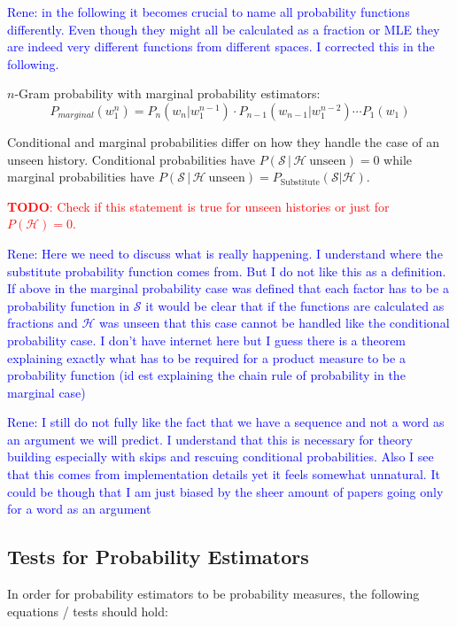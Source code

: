 \documentclass[11pt,a4paper]{article}
\newcommand{\Seq}{\mathcal{S}}
\newcommand{\Hist}{\mathcal{H}}
\newcommand{\todo}[1]{\textcolor{red}{\textbf{TODO}: #1}}
\newcommand{\rp}[1]{\textcolor{blue}{Rene: #1}}
\begin{document}
  \rp{in the following it becomes crucial to name all probability functions
  differently. Even though they might all be calculated as a fraction or MLE
  they are indeed very different functions from different spaces. I corrected
  this in the following.}

  $n$-Gram probability with marginal probability estimators:
  \begin{equation}
    P_{marginal}(w_1^n) = P_n(w_n | w_1^{n-1}) \cdot P_{n-1}(w_{n-1} | w_1^{n-2}) \dotsm P_1(w_1)
  \end{equation}

  Conditional and marginal probabilities differ  on how they handle the case of
  an unseen history. Conditional probabilities have
  $P(\Seq \, | \, \Hist \: \mathrm{unseen}) = 0$
  while marginal probabilities have
  $P(\Seq \, | \, \Hist \: \mathrm{unseen}) = P_\mathrm{Substitute}(\Seq | \Hist)$.

  \todo{Check if this statement is true for unseen histories or just for
  $P(\Hist) = 0$.}

  \rp{Here we need to discuss what is really happening. I understand where the
  substitute probability function comes from. But I do not like this as a
  definition. If above in the marginal probability case was defined that each
  factor has to be a probability function in $\Seq$ it would be clear that if
  the functions are calculated as fractions and $\Hist$ was unseen that this
  case cannot be handled like the conditional probability case. I don't have
  internet here but I guess there is a theorem explaining exactly what has to be
  required for a product measure to be a probability function (id est explaining
  the chain rule of probability in the marginal case)}

  \rp{I still do not fully like the fact that we have a sequence and not a word
  as an argument we will predict. I understand that this is necessary for theory
  building especially with skips and rescuing conditional probabilities. Also I
  see that this comes from implementation details yet it feels somewhat
  unnatural. It could be though that I am just biased by the sheer amount of
  papers going only for a word as an argument}

  \subsection{Tests for Probability Estimators}

  In order for probability estimators to be probability measures, the
  following equations / tests should hold:
\end{document}
